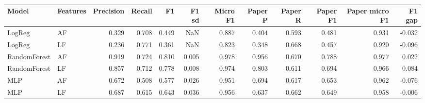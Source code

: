 \begin{tabular}{llrrrrrrrrrr}
\toprule
Model & Features & Precision & Recall & F1 & F1 sd & Micro F1 & Paper P & Paper R & Paper F1 & Paper micro F1 & F1 gap \\
\midrule
LogReg & AF & 0.329 & 0.708 & 0.449 & NaN & 0.887 & 0.404 & 0.593 & 0.481 & 0.931 & -0.032 \\
LogReg & LF & 0.236 & 0.771 & 0.361 & NaN & 0.823 & 0.348 & 0.668 & 0.457 & 0.920 & -0.096 \\
RandomForest & AF & 0.919 & 0.724 & 0.810 & 0.005 & 0.978 & 0.956 & 0.670 & 0.788 & 0.977 & 0.022 \\
RandomForest & LF & 0.857 & 0.712 & 0.778 & 0.008 & 0.974 & 0.803 & 0.611 & 0.694 & 0.966 & 0.084 \\
MLP & AF & 0.672 & 0.508 & 0.577 & 0.026 & 0.951 & 0.694 & 0.617 & 0.653 & 0.962 & -0.076 \\
MLP & LF & 0.687 & 0.615 & 0.643 & 0.036 & 0.956 & 0.637 & 0.662 & 0.649 & 0.958 & -0.006 \\
\bottomrule
\end{tabular}
